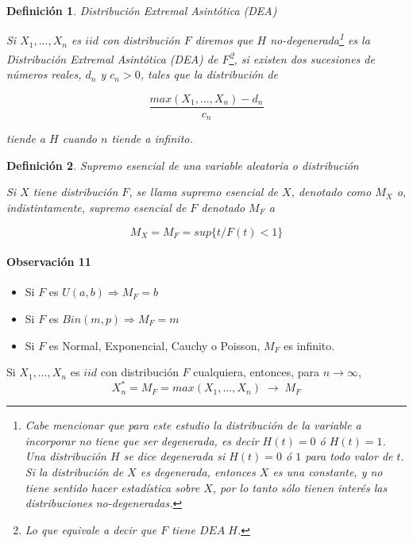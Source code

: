\documentclass[
  12pt]{article}
\newtheorem{definition}{Definición}[section]
\begin{document}
\begin{definition} Distribución Extremal Asintótica (DEA)

Si $X_1,...,X_n$  es $iid$ con distribución $F$ diremos que $H$ no-degenerada\footnote{Cabe mencionar que para este estudio la distribución de la variable a incorporar no tiene que ser degenerada, es decir $H(t)=0$ ó $H(t)=1$. Una distribución $H$ se dice degenerada si $H(t)=0$ ó $1$ para todo valor de $t$. Si la distribución de $X$ es degenerada, entonces $X$ es una constante, y no tiene sentido hacer estadística sobre $X$, por lo tanto sólo tienen interés las distribuciones no-degeneradas.} es la Distribución Extremal Asintótica (DEA) de $F$\footnote{Lo que equivale a decir que $F$ tiene $DEA\;H$.}, si existen dos sucesiones de números reales, $d_n$ y $c_n>0$, tales que la distribución de

\begin{equation}
\frac{max(X_1,...,X_n)- d_n}{c_n}\label{eq:max}
\end{equation}

tiende a $H$ cuando $n$ tiende a infinito.
\end{definition}

\begin{definition} Supremo esencial de una variable aleatoria o distribución

Si $X$ tiene distribución $F$, se llama supremo esencial de $X$, denotado como $M_X$ o, indistintamente, supremo esencial de $F$ denotado $M_F$ a

\begin{equation}
M_X=M_F= sup\{t / F(t)<1\}\label{eq:Mx}
\end{equation}
\end{definition}

\paragraph*{Observación 11}

\begin{itemize}
\item Si $F$ es $U(a,b) \Rightarrow M_F=b$
\item Si $F$ es $Bin(m,p) \Rightarrow M_F=m$
\item Si $F$ es Normal, Exponencial, Cauchy o Poisson, $M_F$ es infinito.
\end{itemize}

\begin{theorem} 
Si $X_1,...,X_n$ es $iid$ con distribución $F$ cualquiera, entonces, para $n\longrightarrow \infty$,
\begin{equation}
X^*_n=M_F= max(X_1,...,X_n)\;\longrightarrow\;M_F \label{eq:Xast}
\end{equation}
\end{theorem}
\end{document}
